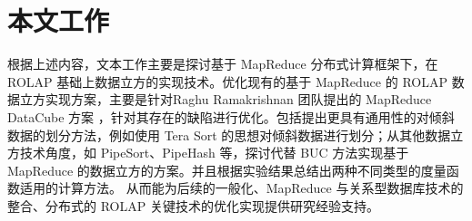 \section{本文工作}

根据上述内容，文本工作主要是探讨基于 MapReduce 分布式计算框架下，在 ROLAP 基础上数据立方的实现技术。优化现有的基于 MapReduce 的 ROLAP 数据立方实现方案，主要是针对Raghu Ramakrishnan 团队提出的 MapReduce DataCube 方案 \cite{nandi2012data} \cite{nandi2011distributed}，针对其存在的缺陷进行优化。包括提出更具有通用性的对倾斜数据的划分方法，例如使用 Tera Sort 的思想对倾斜数据进行划分；从其他数据立方技术角度，如 PipeSort、PipeHash 等，探讨代替 BUC 方法实现基于 MapReduce 的数据立方的方案。并且根据实验结果总结出两种不同类型的度量函数适用的计算方法。 从而能为后续的一般化、MapReduce 与关系型数据库技术的整合、分布式的 ROLAP 关键技术的优化实现提供研究经验支持。


